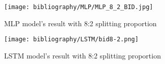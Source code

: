 \documentclass{ieeeojies}
\begin{document}
\begin{figure}[H]
  \centering
  \begin{minipage}{0.8\linewidth}
    \centering
    \texttt{[image: bibliography/MLP/MLP\_8\_2\_BID.jpg]}
    \caption{MLP model's result with 8:2 splitting proportion}
    \label{fig15}
  \end{minipage}
\end{figure}
\begin{figure}[H]
  \centering
  \begin{minipage}{0.8\linewidth}
    \centering
    \texttt{[image: bibliography/LSTM/bid8-2.png]}
    \caption{LSTM model's result with 8:2 splitting proportion}
    \label{fig15}
  \end{minipage}
\end{figure}
\end{document}
